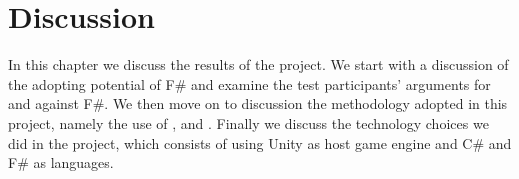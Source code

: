 \chapter{Discussion}
In this chapter we discuss the results of the project. We start with a discussion of the adopting potential of F\# and examine the test participants' arguments for and against F\#. We then move on to discussion the methodology adopted in this project, namely the use of \champagne, \attention and \cognitive. Finally we discuss the technology choices we did in the project, which consists of using Unity as host game engine and C\# and F\# as languages.



